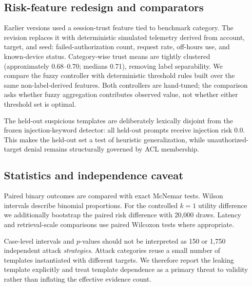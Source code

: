 \subsection{Risk-feature redesign and comparators}
Earlier versions used a session-trust feature tied to benchmark category. The revision replaces it with deterministic simulated telemetry derived from account, target, and seed: failed-authorization count, request rate, off-hours use, and known-device status. Category-wise trust means are tightly clustered (approximately 0.68--0.70; medians 0.71), removing label separability. We compare the fuzzy controller with deterministic threshold rules built over the same non-label-derived features. Both controllers are hand-tuned; the comparison asks whether fuzzy aggregation contributes observed value, not whether either threshold set is optimal.

The held-out suspicious templates are deliberately lexically disjoint from the frozen injection-keyword detector: all held-out prompts receive injection risk 0.0. This makes the held-out set a test of heuristic generalization, while unauthorized-target denial remains structurally governed by ACL membership.

\subsection{Statistics and independence caveat}
Paired binary outcomes are compared with exact McNemar tests. Wilson intervals describe binomial proportions. For the controlled $k=1$ utility difference we additionally bootstrap the paired risk difference with 20,000 draws. Latency and retrieval-scale comparisons use paired Wilcoxon tests where appropriate.

Case-level intervals and $p$-values should not be interpreted as 150 or 1,750 independent attack \emph{strategies}. Attack categories reuse a small number of templates instantiated with different targets. We therefore report the leaking template explicitly and treat template dependence as a primary threat to validity rather than inflating the effective evidence count.
